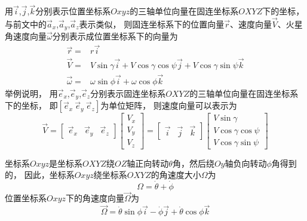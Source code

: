 用$\vec{i}$,$\vec{j}$,$\vec{k}$分别表示位置坐标系$Oxyz$的三轴单位向量在固连坐标系$OXYZ$下的坐标，
与前文中的$\vec{a}_x$,$\vec{a}_y$,$\vec{a}_z$表示类似，
则固连坐标系下的位置向量$\vec{r}$、速度向量$\vec{V}$、火星角速度向量$\vec{\omega}$分别表示成位置坐标系下的向量为
\begin{align*}
    \vec{r} =& r\vec{i} \\
    \vec{V} =& V\sin\gamma\vec{i} + V\cos\gamma\cos\psi\vec{j} + V\cos\gamma\sin\psi\vec{k} \\
    \vec{\omega} =& \omega\sin\phi\vec{i} + \omega\cos\phi\vec{k}
\end{align*}
举例说明，
用$\vec{e}_x$,$\vec{e}_y$,$\vec{e}_z$分别表示固连坐标系$OXYZ$的三轴单位向量在固连坐标系下的坐标，
即$[\vec{e}_x\ \vec{e}_y\ \vec{e}_z]$为单位矩阵，
则速度向量可以表示为
\begin{equation*}
    \vec{V}
    =\left[\begin{matrix}
        \vec{e}_x & \vec{e}_y & \vec{e}_z
    \end{matrix}\right]
    \left[\begin{matrix}
        V_x \\ V_y \\ V_z
    \end{matrix}\right]
    =\left[\begin{matrix}
        \vec{i} & \vec{j} & \vec{k}
    \end{matrix}\right]
    \left[\begin{matrix}
        V\sin\gamma \\ V\cos\gamma\cos\psi \\ V\cos\gamma\sin\psi
    \end{matrix}\right]
\end{equation*}

坐标系$Oxyz$是坐标系$OXYZ$绕$OZ$轴正向转动$\theta$角，然后绕$Oy$轴负向转动$\phi$角得到的，
因此，坐标系$Oxyz$绕坐标系$OXYZ$的角速度大小$\Omega$为
\[\Omega = \dot{\theta} + \dot{\phi}\]
位置坐标系$Oxyz$下的角速度向量$\vec{\Omega}$为
\[\vec{\Omega} = \dot{\theta}\sin\phi\vec{i} - \dot{\phi}\vec{j} +\dot{\theta}\cos\phi\vec{k}\]

